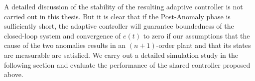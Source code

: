 A detailed discussion of the stability of the resulting adaptive controller is not carried out in this thesis. But it is clear that if the Post-Anomaly phase is sufficiently short, the adaptive controller will guarantee boundedness of the closed-loop system and convergence of $e(t)$ to zero if our assumptions that the cause of the two anomalies results in an $(n+1)$-order plant and that its states are measurable are satisfied. We carry out a detailed simulation study in the following section and evaluate the performance of the shared controller proposed above.

\begin{comment}

Following this time instant, the pilot detects the anomalous vehicle dynamics, and at $t=t_2^*$ indicates to the adaptive autopilot the perceived increase in order. Using this pilot input, we propose an adaptive controller predicated on a third-order dynamics of the open-loop plant and assume that in addition to the bank angle and roll rate, angular acceleration $\dot{p}$ is also measurable. We choose a reference model as
\begin{equation}
	\underbrace{\begin{bmatrix}
		\dot{\phi}_d \\ \dot{p}_d \\ \ddot{p}_d
	\end{bmatrix}}_{\dot{x}_m'} = \underbrace{\begin{bmatrix}
		0 & 1 & 0\\ 0 & 0 & 1 \\ -a_{m,1}' & -a_{m,2}' & -a_{m,3}'
	\end{bmatrix}}_{A_m'} \underbrace{\begin{bmatrix}
		\phi_d \\ p_d \\ \dot{p}_d
	\end{bmatrix}}_{x_m'} + \underbrace{\begin{bmatrix}
		0 \\ 0 \\ b_{m,3}'
	\end{bmatrix}}_{B_m'} r - L_m' e'
	\label{eqn:rm_3_symbolic}
\end{equation}

The time interval $[t_1^*, \quad t_2^*]$ is indicated as Post-Anomaly and the interval $t \geq t_2^*$ is indicated as Post-Correction. For case (i), $\theta^* \in \mathbb{R}^3$ and $q^*$ exist that solve the corresponding matching conditions in (\ref{eqn:matchcond1}) and (\ref{eqn:matchcond2}), and an adaptive controller as in (\ref{eqn:thetadot_projection}) and (\ref{eqn:qdot_projection}) can be realized to lead to a stable closed-loop solutions and accurate tracking. These matching conditions are not met, however, in case (ii). In the numerical examples, we will discuss the details of how such an adaptive controller with an increase in dimension following the pilot input performs for both cases of anomalies. 


\end{comment}
